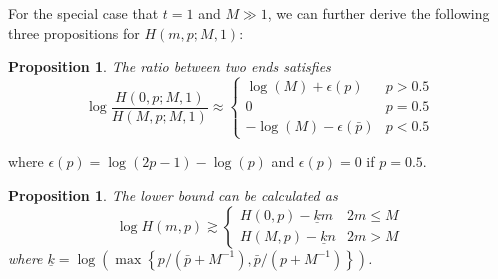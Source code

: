 \documentclass{article}
\newtheorem{proposition}[theorem]{Proposition}
\begin{document}
For the special case that $t=1$ and $M\gg 1$, we can further derive the following three propositions for $H(m,p;M,1)$:
\begin{proposition}
\label{Ratio1}
The ratio between two ends satisfies
$$\log\frac{H(0,p;M,1)}{H(M,p;M,1)} \approx \left\{
    \begin{array}{cl}
    \log(M)+\epsilon(p) & p>0.5\\
    0 & p=0.5\\
    -\log(M)-\epsilon(\bar{p}) & p<0.5
    \end{array}\right.$$
\end{proposition}
where $\epsilon(p)=\log(2p-1)-\log(p)$ and $\epsilon(p)=0$ if $p=0.5$.
\begin{proposition}
\label{LowBound1}
The lower bound can be calculated as
\begin{equation*}
\log H(m,p)\gtrsim \left\{
    \begin{array}{cl}
    H(0,p)- \underline{k}m& 2m\leq M\\
    H(M,p)- \underline{k}n& 2m>M
    \end{array}\right.
\end{equation*}
where $\underline{k}=\log\left(\max\left\{p/(\bar{p}+M^{-1}),\bar{p}/(p+M^{-1})\right\}\right)$.
\end{proposition}
\end{document}
